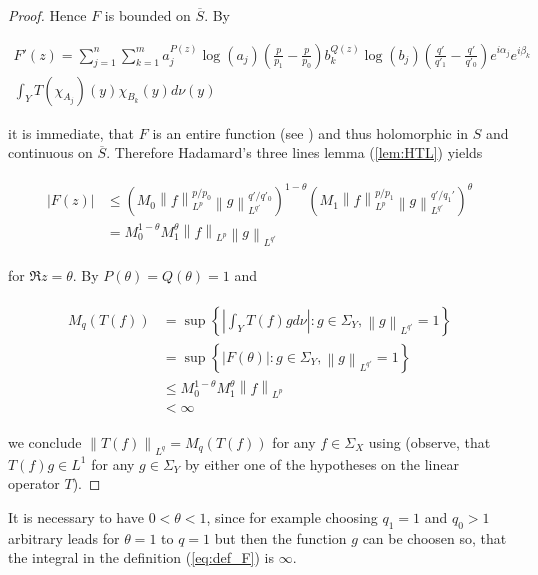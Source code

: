 \begin{proof}
	Hence $F$ is bounded on $\overline{S}$. By 

\begin{multline*}
	F'(z) = \sum_{j = 1}^n\sum_{k = 1}^m a^{P(z)}_j\log \left( a_j \right) \left( \frac{p}{p_1} - \frac{p}{p_0} \right) b_k^{Q(z)}\log\left( b_j \right)\left( \frac{q'}{q'_1} - \frac{q'}{q'_0} \right) e^{i\alpha_j} e^{i\beta_k} \\\int_YT(\chi_{A_j})(y)\chi_{B_k}(y)d\nu(y) 	
\end{multline*}

	it is immediate, that $F$ is an entire function (see \cite[198]{rudin:rc_analysis:1987}) and thus holomorphic in $S$ and continuous on $\overline{S}$. Therefore Hadamard's three lines lemma (\ref{lem:HTL}) yields

\begin{gather*}
	\begin{aligned}
		\left| F(z) \right| &\leqslant \left( M_0  \left\|f\right\|_{L^p}^{p/p_0} \left\|g\right\|_{L^{q'}}^{q'/q'_0} \right)^{1 - \theta}\left(  M_1 \left\|f\right\|_{L^p}^{p/p_1}\left\|g\right\|_{L^{q'}}^{q'/q_1'} \right)^\theta\\
			&= M_0^{1 - \theta}M_1^\theta \left\|f\right\|_{L^p}\left\|g\right\|_{L^{q'}}
	\end{aligned}
\end{gather*}

	for $\Re z = \theta$. By $P(\theta) = Q(\theta) = 1$ and

\begin{gather*}
	\begin{aligned}
		M_q\left( T(f) \right) &= \sup\left\{\left| \int_Y T(f)gd\nu\right| : g \in \Sigma_Y, \left\|g\right\|_{L^{q'}} = 1\right\}\\
		&=  \sup\left\{\left| F(\theta)\right| : g \in \Sigma_Y, \left\|g\right\|_{L^{q'}} = 1\right\}\\
		&\leqslant M_0^{1 - \theta}M_1^\theta \left\|f\right\|_{L^p}\\
		&< \infty
	\end{aligned}
\end{gather*}

	we conclude $\left\| T(f)\right\|_{L^q} = M_q\left( T(f) \right)$ for any $f \in \Sigma_X$ using \cite[189]{folland:real_analysis:1999} (observe, that $T(f)g \in L^1$ for any $g \in \Sigma_Y$ by either one of the hypotheses on the linear operator $T$).
\end{proof}

\begin{remark}
	It is necessary to have $0 < \theta < 1$, since for example choosing $q_1 = 1$ and $q_0 > 1$ arbitrary leads for $\theta = 1$ to $q = 1$ but then the function $g$ can be choosen so, that the integral in the definition \textup{(\ref{eq:def_F})} is $\infty$.
\end{remark}


